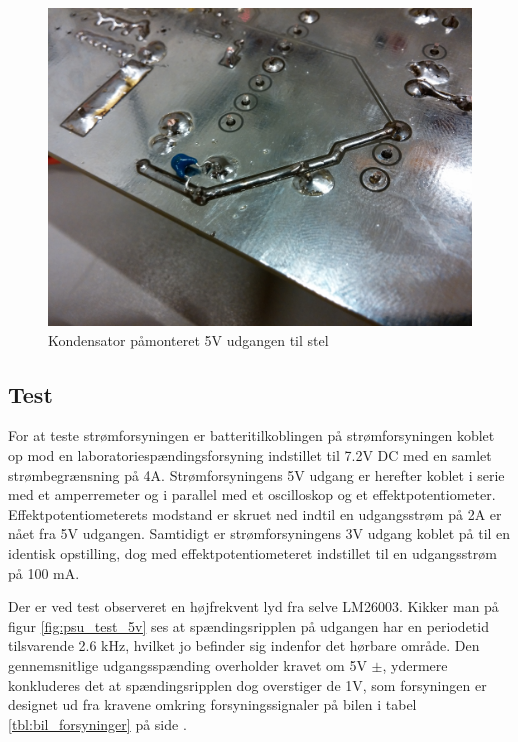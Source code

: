 \begin{figure}[h]
\centering
\includegraphics[width=\textwidth- 5cm]{../fig/billeder/impl_psu/psu_afkobl_konden}
\caption{Kondensator påmonteret 5V udgangen til stel}
\label{fig:bil_psu_C5v_img}
\end{figure}

\clearpage

\subsection{Test}

For at teste strømforsyningen er batteritilkoblingen på strømforsyningen koblet op mod en laboratoriespændingsforsyning indstillet til 7.2V DC med en samlet strømbegrænsning på 4A.
Strømforsyningens 5V udgang er herefter koblet i serie med et amperremeter og i parallel med et oscilloskop og et effektpotentiometer.
Effektpotentiometerets modstand er skruet ned indtil en udgangsstrøm på 2A er nået fra 5V udgangen.
Samtidigt er strømforsyningens 3V udgang koblet på til en identisk opstilling, dog med effektpotentiometeret indstillet til en udgangsstrøm på 100 mA.

Der er ved test observeret en højfrekvent lyd fra selve LM26003. 
Kikker man på figur \ref{fig:psu_test_5v} ses at spændingsripplen på udgangen har en periodetid tilsvarende 2.6 kHz, hvilket jo befinder sig indenfor det hørbare område. 
Den gennemsnitlige udgangsspænding overholder kravet om 5V $\pm$, ydermere konkluderes det at spændingsripplen dog overstiger de 1V, som forsyningen er designet ud fra kravene omkring forsyningssignaler på bilen i tabel \ref{tbl:bil_forsyninger} på side \pageref{tbl:bil_forsyninger}.

